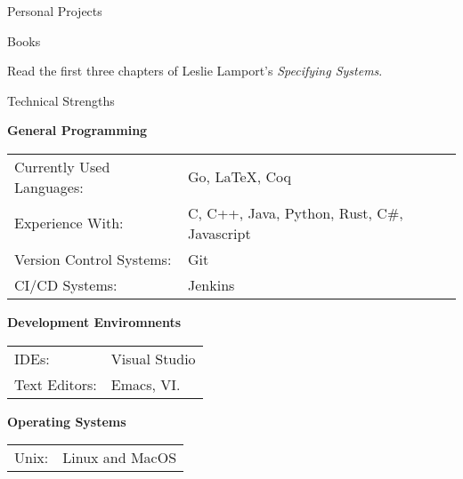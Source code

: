 \documentclass{resume} %
\newcommand{\btab}[2]{
  \bgroup
  \def\arraystretch{#1}
  \begin{tabular}{#2}
}
\newcommand{\etab}{
  \end{tabular} \smallskip
  \egroup
}
\begin{document}
\begin{rSection}{Personal Projects}

  \begin{rSubsection}{Books}{}{}{}
  \item Read the first three chapters of Leslie Lamport's \textit{Specifying Systems}.
  \end{rSubsection}

\end{rSection}


\begin{rSection}{Technical Strengths}

  {\bf General Programming}

  \btab{1.1}{ l l }
  Currently Used Languages: & Go, \LaTeX, Coq \\
  Experience With: & C, C++, Java, Python, Rust, C\#, Javascript \\
  Version Control Systems: & Git \\
  CI/CD Systems: & Jenkins \\
  \etab

  {\bf Development Enviromnents}

  \btab{1.1}{ l l }
  IDEs: & Visual Studio \\
  Text Editors: & Emacs, VI. \\
  \etab

  {\bf Operating Systems}

  \btab{1.1}{ l l }
  Unix: & Linux and MacOS
  \etab

\end{rSection}
\end{document}
